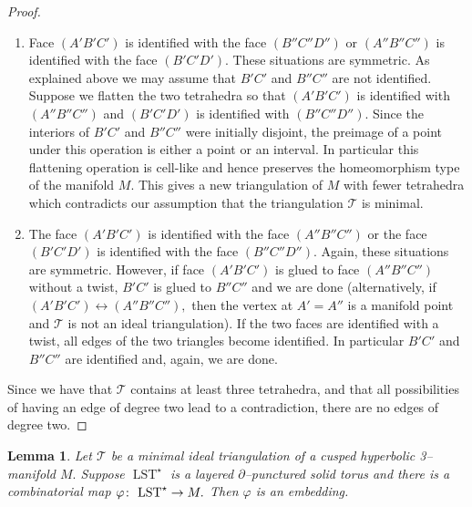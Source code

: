 \documentclass[a4paper]{gtart}
\def\lst{\operatorname{LST}}
\def\tri{\mathcal{T}}
\def\manifold{M}
\theoremstyle{plain}
\newtheorem{lemma}[theorem]{Lemma}
\theoremstyle{definition}
\theoremstyle{remark}
\numberwithin{equation}{section}
\begin{document}
\begin{proof}
\begin{enumerate}
  \item Face $(A'B'C')$ is identified with the face $(B''C''D'')$ or $(A''B''C'')$ is identified with the face $(B'C'D').$ These situations are symmetric. As explained above we may assume that $B'C'$ and $B''C''$ are not identified. Suppose we flatten the two tetrahedra so that $(A'B'C')$ is identified with $(A''B''C'')$ and $(B'C'D')$ is identified with $(B''C''D'').$ Since the interiors of $B'C'$ and $B''C''$ were initially disjoint, the preimage of a point under this operation is either a point or an interval. In particular this flattening operation is cell-like and hence preserves the homeomorphism type of the manifold $\manifold.$ This gives a new triangulation of $\manifold$ with fewer tetrahedra which contradicts our assumption that the triangulation $\tri$ is minimal. 

  \item The face $(A'B'C')$ is identified with the face $(A''B''C'')$ or the face $(B'C'D')$ is identified with the face $(B''C''D'').$ Again, these situations are symmetric. However, if face $(A'B'C')$ is glued to face $(A''B''C'')$ without a twist, $B'C'$ is glued to $B''C''$ and we are done (alternatively, if $(A'B'C')\leftrightarrow (A''B''C''),$  then the vertex at $A' =A''$ is a manifold point and $\tri$ is not an ideal triangulation). If the two faces are identified with a twist, all edges of the two triangles become identified. In particular $B'C'$ and $B''C''$ are identified and, again, we are done. 
\end{enumerate}

Since we have that $\tri$ contains at least three tetrahedra, and that all possibilities of having an edge of degree two lead to a contradiction, there are no edges of degree two. 
\end{proof}

\begin{lemma}
\label{lem:lst no folds}
Let $\tri$ be a minimal ideal triangulation of a cusped hyperbolic 3--manifold $\manifold.$ Suppose $\lst^{\star}$ is a layered $\partial$--punctured solid torus and there is a combinatorial map $\varphi\co\lst^{\star}\to \manifold.$ Then $\varphi$ is an embedding.
\end{lemma}
\end{document}
